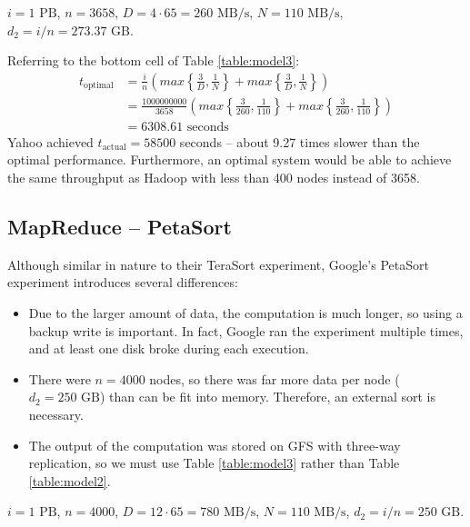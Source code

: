 \documentclass{acm_proc_article-sp}
\begin{document}
$i = 1 \text{ PB}$, $n = 3658$, $D = 4 \cdot 65 = 260 \text{ MB/s}$, $N = 110 \text{ MB/s}$, $d_2 = i/n = 273.37 \text{ GB}$.

Referring to the bottom cell of Table \ref{table:model3}:
\begin{align*}
t_\text{optimal} &= \frac{i}{n} \left( max\left\{\frac{3}{D}, \frac{1}{N}\right\} + max\left\{\frac{3}{D}, \frac{1}{N}\right\} \right)\\
  &= \frac{1000000000}{3658} \left( max\left\{\frac{3}{260}, \frac{1}{110}\right\} + max\left\{\frac{3}{260}, \frac{1}{110}\right\} \right)\\
  &= 6308.61 \text{ seconds}
\end{align*}
Yahoo achieved $t_\text{actual} = 58500$ seconds -- about 9.27 times slower
than the optimal performance. Furthermore, an optimal system would be able to
achieve the same throughput as Hadoop with less than 400
nodes instead of 3658.

\subsection{MapReduce -- PetaSort}

Although similar in nature to their TeraSort experiment, Google's PetaSort
experiment introduces several differences:
\begin{itemize}
  \item Due to the larger amount of data, the computation is much longer, so
  using a backup write is important. In fact, Google ran the experiment
  multiple times, and at least one disk broke during each execution.
  \item There were $n = 4000$ nodes, so there was far more data per node ($d_2
  = 250 \text{ GB}$) than can be fit into memory. Therefore, an external sort
  is necessary.
  \item The output of the computation was stored on GFS with three-way
  replication, so we must use Table \ref{table:model3} rather than Table
  \ref{table:model2}.
\end{itemize}

$i = 1 \text{ PB}$, $n = 4000$, $D = 12 \cdot 65 = 780 \text{ MB/s}$, $N = 110
\text{ MB/s}$, $d_2 = i/n = 250 \text{ GB}$. 
\end{document}
